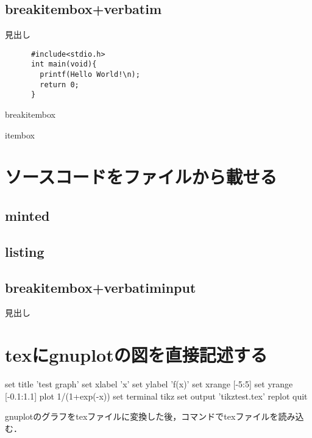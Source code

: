 \documentclass[a4j,titlepage,dvipdfmx,uplatex]{jsarticle}   %
\begin{document}
  \subsection{breakitembox+verbatim}

  \begin{breakitembox}[l]{見出し}
    \begin{verbatim}
      #include<stdio.h>
      int main(void){
        printf(Hello World!\n);
        return 0;
      }
    \end{verbatim}
  \end{breakitembox}
  \begin{breakitembox}[l]{breakitembox}
    
  \end{breakitembox}

  \begin{itembox}[l]{itembox}
    
  \end{itembox}

\section{ソースコードをファイルから載せる}
\subsection{minted}

\subsection{listing}


\subsection{breakitembox+verbatiminput}
\begin{breakitembox}[l]{見出し}
   
\end{breakitembox}

\section{texにgnuplotの図を直接記述する}
\begin{shellcode}
  set title 'test graph'
  set xlabel 'x'
  set ylabel 'f(x)'
  set xrange [-5:5]
  set yrange [-0.1:1.1]
  plot 1/(1+exp(-x))
  set terminal tikz
  set output 'tikztest.tex'
  replot
  quit
\end{shellcode}
gnuplotのグラフをtexファイルに変換した後，\verb||コマンドでtexファイルを読み込む．
\end{document}
